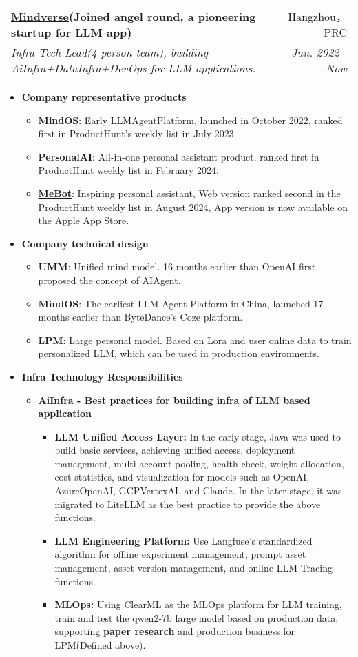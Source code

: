 \documentclass[letterpaper,11pt]{article}
\makeatletter
\newcommand{\resumeSubheading}[4]{
	\vspace{-1pt}\item
	\begin{tabular*}{0.97\textwidth}[t]{l@{\extracolsep{\fill}}r}
		\textbf{#1} & #2 \\
		\textit{\small#3} & \textit{\small #4} \\
	\end{tabular*}\vspace{-5pt}
}
\makeatother
\begin{document}
\begin{spacing}{0.9}
	
	\resumeSubheading
	{\href{https://home.mindos.com}{Mindverse}(Joined angel round, a pioneering startup for LLM app)}{Hangzhou，PRC}
	{Infra Tech Lead(4-person team), building AiInfra+DataInfra+DevOps for LLM applications.}{Jun. 2022 - Now}
	\begin{itemize}
		\item \textbf{Company representative products}
		\begin{itemize}
			\item \href{https://mindos.com}{\textbf{MindOS}}: Early LLMAgentPlatform, launched in October 2022, ranked first in ProductHunt's weekly list in July 2023.
			\item \textbf{PersonalAI}: All-in-one personal assistant product, ranked first in ProductHunt weekly list in February 2024.
			\item \href{https://me.bot}{\textbf{MeBot}}: Inspiring personal assistant, Web version ranked second in the ProductHunt weekly list in August 2024, App version is now available on the Apple App Store.
		\end{itemize}
		\item \textbf{Company technical design}
		\begin{itemize}
			\item {\textbf{UMM}}: Unified mind model. 16 months earlier than OpenAI first proposed the concept of AIAgent.
			\item {\textbf{MindOS}}: The earliest LLM Agent Platform in China, launched 17 months earlier than ByteDance's Coze platform.
			\item {\textbf{LPM}}: Large personal model. Based on Lora and user online data to train personalized LLM, which can be used in production environments.
		\end{itemize}
		\item \textbf{Infra Technology Responsibilities}
		\begin{itemize}
			\item \textbf{AiInfra - Best practices for building infra of LLM based application}
			\begin{itemize}
				\item \textbf{LLM Unified Access Layer: }In the early stage, Java was used to build basic services, achieving unified access, deployment management, multi-account pooling, health check, weight allocation, cost statistics, and visualization for models such as OpenAI, AzureOpenAI, GCPVertexAI, and Claude. In the later stage, it was migrated to LiteLLM as the best practice to provide the above functions.
				\item \textbf{LLM Engineering Platform: }Use Langfuse's standardized algorithm for offline experiment management, prompt asset management, asset version management, and online LLM-Tracing functions.
				\item \textbf{MLOps: }Using ClearML as the MLOps platform for LLM training, train and test the qwen2-7b large model based on production data, supporting \href{https://arxiv.org/abs/2406.18312}{\textbf{paper research}} and production business for LPM(Defined above).
			\end{itemize}
			

\end{itemize}
\end{itemize}
\end{spacing}
\end{document}
